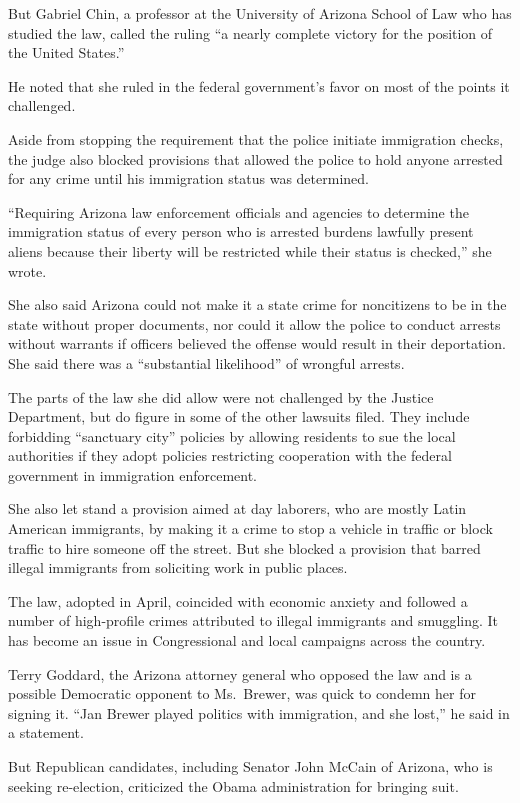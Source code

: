 ﻿\documentclass[12pt]{article}
\begin{document}
But Gabriel Chin, a professor at the University of Arizona School of Law who has studied the law,
called the ruling ``a nearly complete victory for the position of the United States.''

He noted that she ruled in the federal government's favor on most of the points it challenged.

Aside from stopping the requirement that the police initiate immigration checks, the judge also
blocked provisions that allowed the police to hold anyone arrested for any crime until his
immigration status was determined.

``Requiring Arizona law enforcement officials and agencies to determine the immigration status of
every person who is arrested burdens lawfully present aliens because their liberty will be
restricted while their status is checked,'' she wrote.

She also said Arizona could not make it a state crime for noncitizens to be in the state without
proper documents, nor could it allow the police to conduct arrests without warrants if officers
believed the offense would result in their deportation. She said there was a ``substantial
likelihood'' of wrongful arrests.

The parts of the law she did allow were not challenged by the Justice Department, but do figure in
some of the other lawsuits filed. They include forbidding ``sanctuary city'' policies by allowing
residents to sue the local authorities if they adopt policies restricting cooperation with the
federal government in immigration enforcement.

She also let stand a provision aimed at day laborers, who are mostly Latin American immigrants, by
making it a crime to stop a vehicle in traffic or block traffic to hire someone off the street. But
she blocked a provision that barred illegal immigrants from soliciting work in public places.

The law, adopted in April, coincided with economic anxiety and followed a number of high-profile
crimes attributed to illegal immigrants and smuggling. It has become an issue in Congressional and
local campaigns across the country.

Terry Goddard, the Arizona attorney general who opposed the law and is a possible Democratic
opponent to Ms.~Brewer, was quick to condemn her for signing it. ``Jan Brewer played politics with
immigration, and she lost,'' he said in a statement.

But Republican candidates, including Senator John McCain of Arizona, who is seeking re-election,
criticized the Obama administration for bringing suit.
\end{document}
